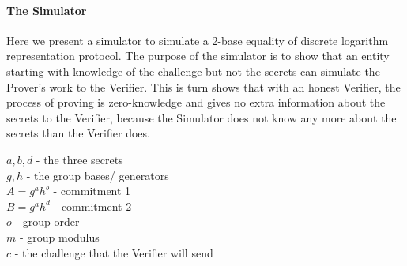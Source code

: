\paragraph{The Simulator} Here we present a simulator to simulate a 2-base equality of discrete logarithm representation protocol. The purpose of the simulator is to show that an entity starting with knowledge of the challenge but not the secrets can simulate the Prover's work to the Verifier. This is turn shows that with an honest Verifier, the process of proving is zero-knowledge and gives no extra information about the secrets to the Verifier, because the Simulator does not know any more about the secrets than the Verifier does.

\noindent$a,b,d$ - the three secrets \\
$g,h$ - the group bases/ generators \\
$A = g^ah^b$ - commitment 1 \\
$B = g^ah^d$ - commitment 2 \\
$o$ - group order\\
$m$ - group modulus\\
$c$ - the challenge that the Verifier will send\\


